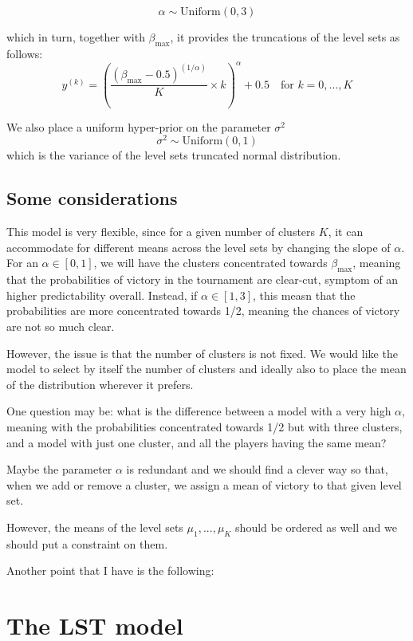 \documentclass[11pt]{amsart}
\begin{document}
\[
\alpha \sim \text{Uniform}(0, 3)
\]

which in turn, together with $\beta_{\max}$, it provides the truncations of the level sets as follows:
\begin{equation}
\label{eq:truncations}
y^{(k)} = \left( \frac{(\beta_{\max} - 0.5)^{(1/\alpha)}}{K} \times k \right)^\alpha + 0.5 \quad \text{for } k = 0, \ldots, K
\end{equation}

We also place a uniform hyper-prior on the parameter $\sigma^2$
\[
\sigma^2 \sim \text{Uniform}(0, 1)
\]
which is the variance of the level sets truncated normal distribution.

\subsection{Some considerations}

This model is very flexible, since for a given number of clusters $K$, it can accommodate for different means across the level sets by changing the slope of $\alpha$. For an $\alpha \in [0,1]$, we will have the clusters concentrated towards $\beta_{\max}$, meaning that the probabilities of victory in the tournament are clear-cut, symptom of an higher predictability overall. Instead, if $\alpha \in [1,3]$, this measn that the probabilities are more concentrated towards 1/2, meaning the chances of victory are not so much clear. 

However, the issue is that the number of clusters is not fixed. We would like the model to select by itself the number of clusters and ideally also to place the mean of the distribution wherever it prefers. 

One question may be: what is the difference between a model with a very high $\alpha$, meaning with the probabilities concentrated towards 1/2 but with three clusters, and a model with just one cluster, and all the players having the same mean?

Maybe the parameter $\alpha$ is redundant and we should find a clever way so that, when we add or remove a cluster, we assign a mean of victory to that given level set.

However, the means of the level sets $\mu_1 ,...,\mu_K$ should be ordered as well and we should put a constraint on them.

Another point that I have is the following:


\section{The LST model}
\end{document}
